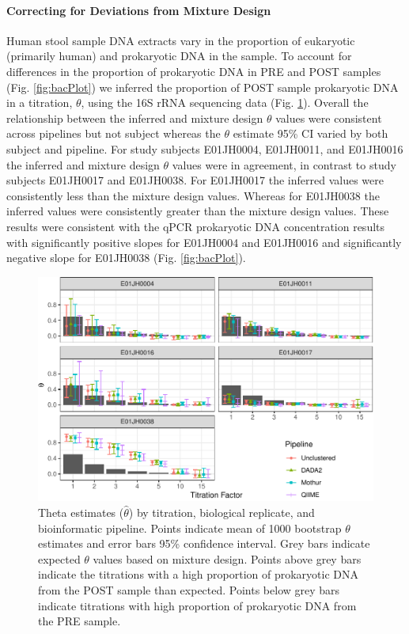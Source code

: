 \documentclass[linenumbers]{bmcart}
\begin{document}
\paragraph*{Correcting for Deviations from Mixture Design}

Human stool sample DNA extracts vary in the proportion of eukaryotic
(primarily human) and prokaryotic DNA in the sample. To account for
differences in the proportion of prokaryotic DNA in PRE and POST samples
(Fig. \ref{fig:bacPlot}) we inferred the proportion of POST sample
prokaryotic DNA in a titration, \(\theta\), using the 16S rRNA
sequencing data (Fig. \ref{fig:thetaHat}). Overall the relationship
between the inferred and mixture design \(\theta\) values were
consistent across pipelines but not subject whereas the \(\theta\)
estimate 95\% CI varied by both subject and pipeline. For study subjects
E01JH0004, E01JH0011, and E01JH0016 the inferred and mixture design
\(\theta\) values were in agreement, in contrast to study subjects
E01JH0017 and E01JH0038. For E01JH0017 the inferred values were
consistently less than the mixture design values. Whereas for E01JH0038
the inferred values were consistently greater than the mixture design
values. These results were consistent with the qPCR prokaryotic DNA
concentration results with significantly positive slopes for E01JH0004
and E01JH0016 and significantly negative slope for E01JH0038 (Fig.
\ref{fig:bacPlot}).

\begin{figure}
\centering
\includegraphics{thetaHat-1.pdf}
\caption{\label{fig:thetaHat}Theta estimates (\(\hat{\theta}\)) by titration, biological
replicate, and bioinformatic pipeline. Points indicate mean
of 1000 bootstrap \(\theta\) estimates and error bars 95\% confidence
interval. Grey bars indicate expected \(\theta\) values based on mixture design.
Points above grey bars indicate the titrations with a high proportion of prokaryotic DNA from the POST sample than expected. Points below grey bars indicate titrations with high proportion of prokaryotic DNA from the PRE sample.}
\end{figure}
\end{document}
